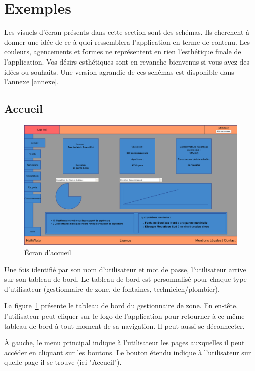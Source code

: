 \documentclass[a4paper, 11pt]{article}
\begin{document}
\begin{itemize}
  \end{itemize}

\section{Exemples}
  \begin{shaded}
    Les visuels d'écran présents dans cette section sont des schémas. Ils cherchent à donner une idée de ce à quoi ressemblera l'application en terme de contenu. Les couleurs, agencements et formes ne représentent en rien l'esthétique finale de l'application. Vos désirs esthétiques sont en revanche bienvenus si vous avez des idées ou souhaits. Une version agrandie de ces schémas est disponible dans l'annexe \ref{annexe}.
  \end{shaded}

  \subsection{Accueil}

    \begin{figure}[H]
        \centering
        \includegraphics[width=.8\textwidth]{Cahier_des_Charges/accueil}
        \caption{\'Ecran d'accueil}
        \label{fig:zone_dashboard}
    \end{figure}

    Une fois identifié par son nom d'utilisateur et mot de passe, l'utilisateur arrive sur son tableau de bord. Le tableau de bord est personnalisé pour chaque type d'utilisateur (gestionnaire de zone, de fontaines, technicien/plombier).

    La figure~\ref{fig:zone_dashboard} présente le tableau de bord du gestionnaire de zone. En en-tête, l'utilisateur peut cliquer sur le logo de l'application pour retourner à ce même tableau de bord à tout moment de sa navigation. Il peut aussi se déconnecter.

    À gauche, le menu principal indique à l'utilisateur les pages auxquelles il peut accéder en cliquant sur les boutons. Le bouton étendu indique à l'utilisateur sur quelle page il se trouve (ici "Accueil").
\end{document}
